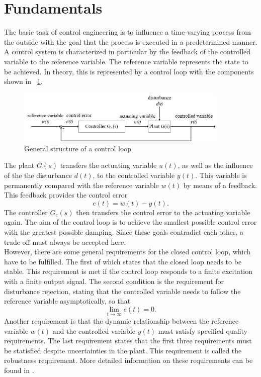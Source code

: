 \section{Fundamentals}
The basic task of control engineering is to influence a time-varying process from the outside with the goal that the process is executed in a predetermined manner. A control system is characterized in particular by the feedback of the controlled variable to the reference variable. The reference variable represents the state to be achieved.
In theory, this is represented by a control loop with the components shown in \figurename~{\ref{fig:control_loop}}.
\begin{figure}
  \centering
  \includegraphics[width=0.9\textwidth]{images/control_loop.jpg}
  \caption[General structure of a control loop]{General structure of a control loop}
  \label{fig:control_loop}
\end{figure}
The plant $G(s)$ transfers the actuating variable $u(t)$, as well as the influence of the the disturbance $d(t)$, to the controlled variable $y(t)$. This variable is permanently compared with the reference variable $w(t)$ by means of a feedback. This feedback provides the control error
\begin{equation}
  e(t) = w(t) - y(t).
 \label{eq:e_t}
\end{equation}
The controller $G_{c}(s)$ then transfers the control error to the actuating variable again. The aim of the control loop is to achieve the smallest possible control error with the greatest possible damping. Since these goals contradict each other, a trade off must always be accepted here.\cite{Reg_17}
\\However, there are some general requirements for the closed control loop, which have to be fulfilled. The first of which states that the closed loop needs to be stable. This requirement is met if the control loop responds to a finite excitation with a finite output signal. The second condition is the requirement for disturbance rejection, stating that the controlled variable needs to follow the reference variable asymptotically, so that
\begin{equation}
    \lim\limits_{t \rightarrow \infty}{e(t)} = 0.
 \label{eq:lim_e}
\end{equation}
Another requirement is that the dynamic relationship between the reference variable $w(t)$ and the controlled variable $y(t)$ must satisfy specified quality requirements.  The last requirement states that the first three requirements must be statisfied despite uncertainties in the plant. This requirement is called the robustness requirement. More detailed information on these requirements can be found in \cite{Reg_10}.

